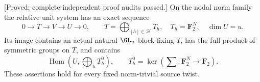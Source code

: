 \begin{lemma}
\label{lem:mixed-odd-normalization-block-hearts-candidate}
\textup{[Proved; complete independent proof audits passed.]}
On the nodal norm family the relative unit system has an exact
sequence
\[
 0\longrightarrow T\longrightarrow V\longrightarrow U
 \longrightarrow0,
 \qquad T=\bigoplus_{[h]\in\mathcal H}T_h,\quad
 T_h=\mathbf F_2^N,\quad\dim U=u.
\]
Its image contains an actual natural $\GL_u$ block fixing $T$,
has the full product of symmetric groups on $T$, and contains
\[
             \operatorname{Hom}\left(U,\bigoplus_hT_h^0\right),
 \qquad T_h^0=\ker\left(\sum:\mathbf F_2^N\to\mathbf F_2\right).
\]
These assertions hold for every fixed norm-trivial source twist.
\end{lemma}
